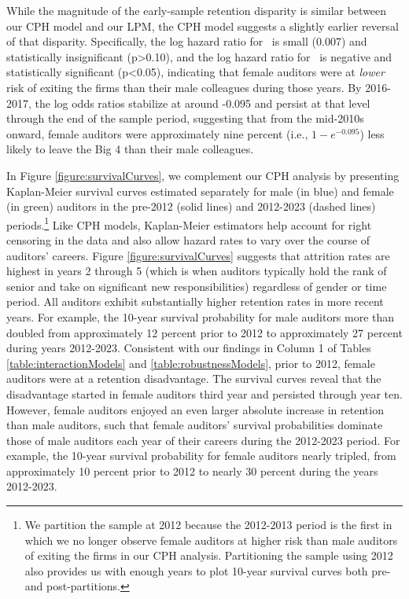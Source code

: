 \documentclass[11pt]{article}
\begin{document}
            While the magnitude of the early-sample retention disparity is similar between our CPH model and our LPM, the CPH model suggests a slightly earlier reversal of that disparity. Specifically, the log hazard ratio for \FEMALExXIItoXIII\ is small (0.007) and statistically insignificant (p>0.10), and the log hazard ratio for \FEMALExXIVtoXV\ is negative and statistically significant (p<0.05), indicating that female auditors were at \textit{lower} risk of exiting the firms than their male colleagues during those years. By 2016-2017, the log odds ratios stabilize at around -0.095 and persist at that level through the end of the sample period, suggesting that from the mid-2010s onward, female auditors were approximately nine percent (i.e., $1-e^{-0.095}$) less likely to leave the Big 4 than their male colleagues. 

            In Figure \ref{figure:survivalCurves}, we complement our CPH analysis by presenting Kaplan-Meier survival curves \parencite{kaplanNonparametricEstimationIncomplete1958} estimated separately for male (in blue) and female (in green) auditors in the pre-2012 (solid lines) and 2012-2023 (dashed lines) periods.\footnote{We partition the sample at 2012 because the 2012-2013 period is the first in which we no longer observe female auditors at higher risk than male auditors of exiting the firms in our CPH analysis. Partitioning the sample using 2012 also provides us with enough years to plot 10-year survival curves both pre- and post-partitions.} Like CPH models, Kaplan-Meier estimators help account for right censoring in the data and also allow hazard rates to vary over the course of auditors' careers. Figure \ref{figure:survivalCurves} suggests that attrition rates are highest in years 2 through 5 (which is when auditors typically hold the rank of senior and take on significant new responsibilities) regardless of gender or time period. All auditors exhibit substantially higher retention rates in more recent years. For example, the 10-year survival probability for male auditors more than doubled from approximately 12 percent prior to 2012 to approximately 27 percent during years 2012-2023. Consistent with our findings in Column 1 of Tables \ref{table:interactionModels} and \ref{table:robustnessModels}, prior to 2012, female auditors were at a retention disadvantage. The survival curves reveal that the disadvantage started in female auditors third year and persisted through year ten. However, female auditors enjoyed an even larger absolute increase in retention than male auditors, such that female auditors' survival probabilities dominate those of male auditors each year of their careers during the 2012-2023 period. For example, the 10-year survival probability for female auditors nearly tripled, from approximately 10 percent prior to 2012 to nearly 30 percent during the years 2012-2023.
        
\end{document}
